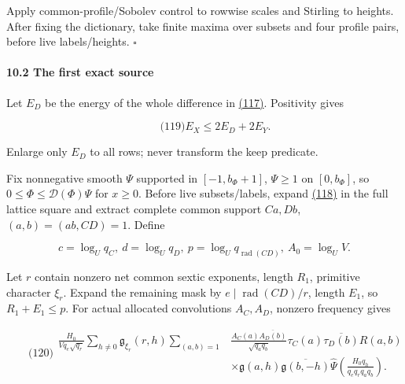 Apply common-profile/Sobolev control to rowwise scales and Stirling to heights. After fixing the dictionary, take finite maxima over subsets and four profile pairs, before live labels/heights. \(\square\)

\hypertarget{sr:first}{}

\label{sr:first}

\hypertarget{the-first-exact-source}{%
\paragraph{10.2 The first exact source}\label{the-first-exact-source}}

Let \(E_D\) be the energy of the whole difference in \protect\hyperlink{sr:comparison}{(117)}. Positivity gives

\hypertarget{sr:positive-comparison}{}

\label{sr:positive-comparison}

\[
\qquad\text{(119)}
 E_X\le2E_D+2E_Y.
\]

Enlarge only \(E_D\) to all rows; never transform the keep predicate.

Fix nonnegative smooth \(\Psi\) supported in \([-1,b_\Phi+1]\), \(\Psi\ge1\) on \([0,b_\Phi]\), so \(0\le\Phi\le\mathcal D(\Phi)\Psi\) for \(x\ge0\). Before live subsets/labels, expand \protect\hyperlink{sr:beta}{(118)} in the full lattice square and extract complete common support \(Ca,Db\), \((a,b)=(ab,CD)=1\). Define

\[
c=\log_Uq_C,\ d=\log_Uq_D,\ p=\log_Uq_{\operatorname{rad}(CD)},\
 A_0=\log_UV.
\]

Let \(r\) contain nonzero net common sextic exponents, length \(R_1\), primitive character \(\xi_r\). Expand the remaining mask by \(e\mid\operatorname{rad}(CD)/r\), length \(E_1\), so \(R_1+E_1\le p\). For actual allocated convolutions \(A_C,A_D\), nonzero frequency gives

\hypertarget{sr:first-poisson}{}

\label{sr:first-poisson}

\[
\qquad\text{(120)}
 \begin{aligned}
 \frac{H_0}{Vq_e\sqrt{q_r}}\sum_{h\ne0}\mathfrak g_{\xi_r}(r,h)
 \sum_{(a,b)=1}&\frac{A_C(a)\overline{A_D(b)}}{\sqrt{q_aq_b}}
 \tau_C(a)\overline{\tau_D(b)}R(a,b)\\
 &\times\mathfrak g(a,h)\overline{\mathfrak g(b,-h)}
 \widehat\Psi\!\left(\frac{H_0q_h}{q_eq_rq_aq_b}\right).
 \end{aligned}
\]

